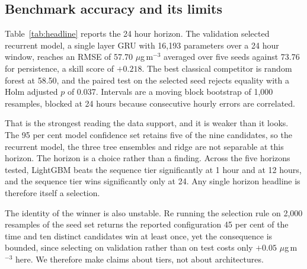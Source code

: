 \documentclass[conference]{IEEEtran}
\newcommand{\ugm}{$\mu$g\,m$^{-3}$}
\begin{document}
\subsection{Benchmark accuracy and its limits}

Table~\ref{tab:headline} reports the 24 hour horizon. The validation selected recurrent model,
a single layer GRU with 16{,}193 parameters over a 24 hour window, reaches an RMSE of 57.70
\ugm{} averaged over five seeds against 73.76 for persistence, a skill score of $+0.218$. The
best classical competitor is random forest at 58.50, and the paired test on the selected seed
rejects equality with a Holm adjusted $p$ of 0.037. Intervals are a moving block bootstrap
of 1{,}000 resamples, blocked at 24 hours because consecutive hourly errors are correlated.

That is the strongest reading the data support, and it is weaker than it looks. The 95 per
cent model confidence set retains five of the nine candidates, so the recurrent model, the
three tree ensembles and ridge are not separable at this horizon. The horizon is a choice
rather than a finding. Across the five horizons tested, LightGBM beats the sequence tier
significantly at 1 hour and at 12 hours, and the sequence tier wins significantly only at 24.
Any single horizon headline is therefore itself a selection.

The identity of the winner is also unstable. Re running the selection rule on 2{,}000 resamples
of the seed set returns the reported configuration 45 per cent of the time and ten distinct
candidates win at least once, yet the consequence is bounded, since selecting on validation
rather than on test costs only $+0.05$ \ugm{} here. We therefore make claims about tiers, not
about architectures.
\end{document}
